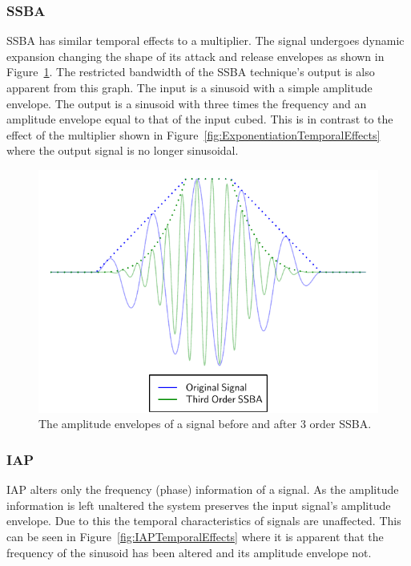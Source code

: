 		\subsubsection*{SSBA}
			SSBA has similar temporal effects to a multiplier. The signal undergoes dynamic expansion changing
			the shape of its attack and release envelopes as shown in Figure~\ref{fig:SSBATemporalEffects}.
			The restricted bandwidth of the SSBA technique's output is also apparent from this graph. The input
			is a sinusoid with a simple amplitude envelope. The output is a sinusoid with three times the
			frequency and an amplitude envelope equal to that of the input cubed. This is in contrast to the
			effect of the multiplier shown in Figure~\ref{fig:ExponentiationTemporalEffects} where the output
			signal is no longer sinusoidal.

			\begin{figure}[h!]
				\centering
				\includegraphics{chapter5/Images/SSBATemporalEffects.pdf}
				\caption{The amplitude envelopes of a signal before and after 3 order SSBA.}
				\label{fig:SSBATemporalEffects}
			\end{figure}

		\subsubsection*{IAP}
			IAP alters only the frequency (phase) information of a signal. As the amplitude information is left
			unaltered the system preserves the input signal's amplitude envelope. Due to this the temporal
			characteristics of signals are unaffected. This can be seen in Figure~\ref{fig:IAPTemporalEffects}
			where it is apparent that the frequency of the sinusoid has been altered and its amplitude envelope
			not.

